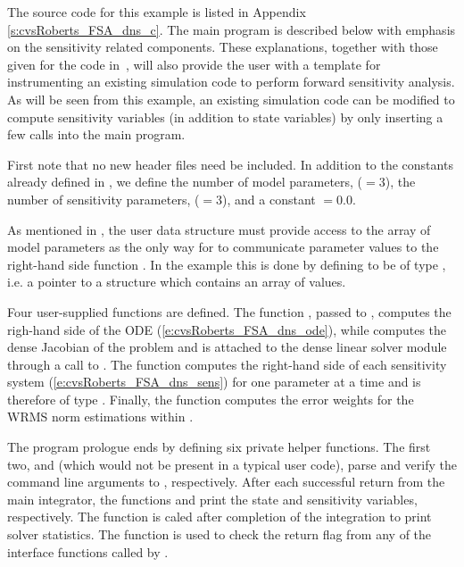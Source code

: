 The source code for this example is listed in Appendix \ref{s:cvsRoberts_FSA_dns_c}.
The main program is described below with emphasis on the sensitivity related components. 
These explanations, together with those given for the code 
in~\cite{cvode_ex}, will also provide the user with a template for instrumenting 
an existing simulation code to perform forward sensitivity analysis.
As will be seen from this example, an existing simulation code can be modified to compute 
sensitivity variables (in addition to state variables) by only inserting a few {\cvodes} 
calls into the main program. 

First note that no new header files need be included. In addition to the constants already
defined in , we define the number of model parameters,  ($=3$),
the number of sensitivity parameters,  ($=3$), and a constant  $=0.0$. 

As mentioned in , the user data
structure  must provide access to the array of model parameters 
as the only way for {\cvodes} to communicate parameter values to the right-hand side 
function . In the  example this is done by defining  to be 
of type , i.e. a pointer to a structure which contains an array of 
  values.

Four user-supplied functions are defined. The function , passed to
, computes the righ-hand side of the ODE (\ref{e:cvsRoberts_FSA_dns_ode}), while
 computes the dense Jacobian of the problem and is attached to the
dense linear solver module {\cvdense} through a call to .
The function  computes the right-hand side of each sensitivity system
(\ref{e:cvsRoberts_FSA_dns_sens}) for one parameter at a time and is therefore of type
. Finally, the function  computes the error weights for the WRMS norm
estimations within {\cvodes}.

The program prologue ends by defining six private helper functions. 
The first two,  and  (which would not be present in 
a typical user code), parse and verify the command line arguments to , respectively.
After each successful return from the main {\cvodes} integrator, the functions 
 and  print the state and sensitivity variables,
respectively. The function  is caled after completion of the
integration to print solver statistics.
The function  is used to check the return flag from any of the
{\cvodes} interface functions called by .

